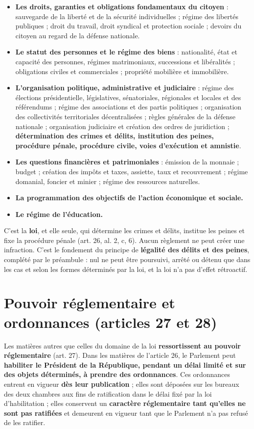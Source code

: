 \documentclass[11pt,a4paper,oneside]{report}
\begin{document}
\begin{itemize}
  \item \textbf{Les droits, garanties et obligations fondamentaux du citoyen} : sauvegarde de la liberté et de la sécurité individuelles ; régime des libertés publiques ; droit du travail, droit syndical et protection sociale ; devoirs du citoyen au regard de la défense nationale.
  \item \textbf{Le statut des personnes et le régime des biens} : nationalité, état et capacité des personnes, régimes matrimoniaux, successions et libéralités ; obligations civiles et commerciales ; propriété mobilière et immobilière.
  \item \textbf{L'organisation politique, administrative et judiciaire} : régime des élections présidentielle, législatives, sénatoriales, régionales et locales et des référendums ; régime des associations et des partis politiques ; organisation des collectivités territoriales décentralisées ; règles générales de la défense nationale ; organisation judiciaire et création des ordres de juridiction ; \textbf{détermination des crimes et délits, institution des peines, procédure pénale, procédure civile, voies d'exécution et amnistie}.
  \item \textbf{Les questions financières et patrimoniales} : émission de la monnaie ; budget ; création des impôts et taxes, assiette, taux et recouvrement ; régime domanial, foncier et minier ; régime des ressources naturelles.
  \item \textbf{La programmation des objectifs de l'action économique et sociale.}
  \item \textbf{Le régime de l'éducation.}
\end{itemize}
\begin{keybox}[title={À retenir — Le point le plus utile pour un policier}]
C'est la \textbf{loi}, et elle seule, qui détermine les crimes et délits, institue les peines et fixe la procédure pénale (art. 26, al. 2, c, 6). Aucun règlement ne peut créer une infraction. C'est le fondement du principe de \textbf{légalité des délits et des peines}, complété par le préambule : nul ne peut être poursuivi, arrêté ou détenu que dans les cas et selon les formes déterminés par la loi, et la loi n'a pas d'effet rétroactif.
\end{keybox}
\section{Pouvoir réglementaire et ordonnances (articles 27 et 28)}
Les matières autres que celles du domaine de la loi \textbf{ressortissent au pouvoir réglementaire} (art. 27). Dans les matières de l'article 26, le Parlement peut \textbf{habiliter le Président de la République, pendant un délai limité et sur des objets déterminés, à prendre des ordonnances}. Ces ordonnances entrent en vigueur \textbf{dès leur publication} ; elles sont déposées sur les bureaux des deux chambres aux fins de ratification dans le délai fixé par la loi d'habilitation ; elles conservent un \textbf{caractère réglementaire tant qu'elles ne sont pas ratifiées} et demeurent en vigueur tant que le Parlement n'a pas refusé de les ratifier.
\end{document}
